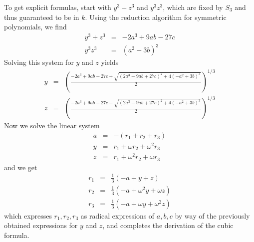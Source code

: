 \documentclass[12pt]{article}
\begin{document}
To get explicit formulas, start with $y^3 + z^3$ and $y^3 z^3$, which are fixed by $S_3$ and thus guaranteed to be in $k$. Using the reduction algorithm for symmetric polynomials, we find
\begin{eqnarray*}
y^3 + z^3 & = & -2a^3 + 9ab - 27c \\
y^3 z^3 & = & (a^2 - 3b)^3
\end{eqnarray*}
Solving this system for $y$ and $z$ yields
\begin{eqnarray*}
y & = & \left(\frac{-2a^3 + 9ab - 27c + \sqrt{(2a^3-9ab+27c)^2 + 4(-a^2+3b)^3}}{2}\right)^{1/3} \\
z & = & \left(\frac{-2a^3 + 9ab - 27c - \sqrt{(2a^3-9ab+27c)^2 + 4(-a^2+3b)^3}}{2}\right)^{1/3}
\end{eqnarray*}
Now we solve the linear system
\begin{eqnarray*}
a & = & -(r_1+r_2+r_3) \\
y & = & r_1 + \omega r_2 + \omega^2 r_3 \\
z & = & r_1 + \omega^2 r_2 + \omega r_3
\end{eqnarray*}
and we get
\begin{eqnarray*}
r_1 & = & \frac{1}{3} (-a + y + z) \\
r_2 & = & \frac{1}{3} (-a + \omega^2 y + \omega z) \\
r_3 & = & \frac{1}{3} (-a + \omega y + \omega^2 z)
\end{eqnarray*}
which expresses $r_1, r_2, r_3$ as radical expressions of $a,b,c$ by way of the previously obtained expressions for $y$ and $z$, and completes the derivation of the cubic formula.
\end{document}
